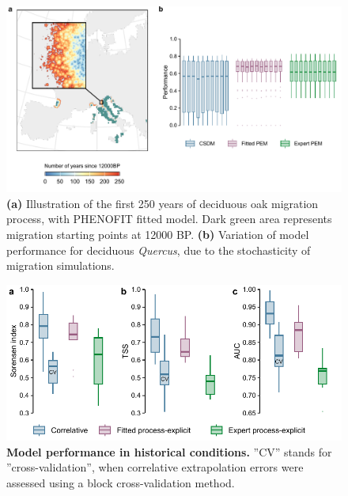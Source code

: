 \begin{figure}
\hspace*{-0.4in}
\centering
\includegraphics{chapter2/figs/supp/figS7_migration_process_stochasticity-1.pdf}
\caption{\textbf{(a)} Illustration of the first 250 years of deciduous oak migration process, with PHENOFIT fitted model. Dark green area represents migration starting points at 12000 BP. \textbf{(b)} Variation of model performance for deciduous \emph{Quercus},  due to the stochasticity of migration simulations.}
\label{fig:S7}
\end{figure}

\begin{figure}
\hspace*{-0.4in}
\centering
\includegraphics{chapter2/figs/supp/figS8_historical_performances-1.pdf}
\caption{\textbf{Model performance in historical conditions.} ”CV” stands for ”cross-validation”, when
correlative extrapolation errors were assessed using a block cross-validation method.}
\label{fig:S8}
\end{figure}

